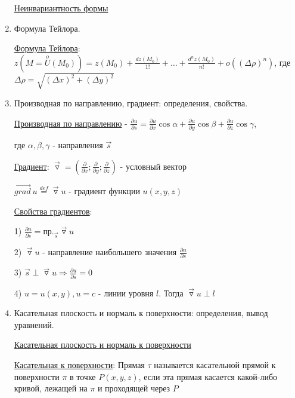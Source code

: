 \documentclass[12pt]{article}
\begin{document}
\begin{enumerate}
        \hyperlink{noninvariantofseconddifferentialoffunctionoftwovariables}{Неинвариантность формы}

        \item Формула Тейлора.

        \hyperlink{formulataylor}{Формула Тейлора}: $\displaystyle z(M = \stackrel{o}{U}(M_0)) = z(M_0) + \frac{dz(M_0)}{1!} + \dots + \frac{d^n z(M_0)}{n!} + o((\Delta \rho)^n)$,
        где $\Delta \rho = \sqrt{(\Delta x)^2 + (\Delta y)^2}$

        \item Производная по направлению, градиент: определения, свойства.

        \hyperlink{derivativeoffunctionindirection}{Производная по направлению} - $\frac{\partial u}{\partial s} = \frac{\partial u}{\partial x} \cos\alpha + \frac{\partial u}{\partial y} \cos\beta + \frac{\partial u}{\partial z} \cos\gamma$,

        где $\alpha, \beta, \gamma$ - направления $\overrightarrow{s}$

        \hyperlink{gradientdefinition}{Градиент}: $\overrightarrow{\triangledown} = \left(\frac{\partial}{\partial x}; \frac{\partial}{\partial y}; \frac{\partial}{\partial z}\right)$ - условный вектор

        $\overrightarrow{grad} \ u \stackrel{def}{=} \overrightarrow{\triangledown} u$ - градиент функции $u(x, y, z)$

        \hyperlink{gradientproperties}{Свойства градиентов}:

        1) $\frac{\partial u}{\partial s} = \text{пр.}_{\overrightarrow{s}} \overrightarrow{\triangledown} u$

        2) $\overrightarrow{\triangledown} u$ - направление наибольшего значения $\frac{\partial u}{\partial s}$

        3) $\overrightarrow{s} \perp \overrightarrow{\triangledown} u \Longrightarrow \frac{\partial u}{\partial s} = 0$

        4) $u = u(x, y), u = c$ - линии уровня $l$. Тогда $\overrightarrow{\triangledown} u \perp l$


        \item Касательная плоскость и нормаль к поверхности: определения, вывод уравнений.

        \hyperlink{tangentandnormaltosurface}{Касательная плоскость и нормаль к поверхности}

        \hyperlink{tangenttosurface}{Касательная к поверхности}: Прямая $\tau$ называется касательной прямой к поверхности $\pi$ в точке $P(x, y, z)$,
        если эта прямая касается какой-либо кривой, лежащей на $\pi$ и проходящей через $P$


\end{enumerate}
\end{document}
